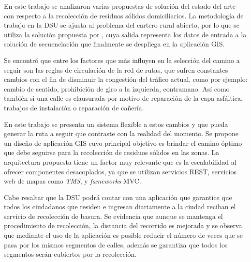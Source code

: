 
En este trabajo se analizaron varias propuestas de solución del estado del arte con respecto a la recolección de residuos sólidos domiciliarios. La metodología de trabajo en la DSU se ajusta al problema del cartero rural abierto, por lo que se utiliza la solución propuesta por \citet{Braier2017AnArgentina}, cuya salida representa los datos de entrada a la solución de secuenciación que finalmente se despliega en la aplicación GIS.

Se encontró que entre los factores que más influyen en la selección del camino a seguir son las reglas de circulación de la red de rutas, que sufren constantes cambios con el fin de disminuir la congestión del tráfico actual, como por ejemplo: cambio de sentido, prohibición de giro a la izquierda, contramano. Así como también si una calle es clausurada por motivo de reparación de la capa asfáltica, trabajos de instalación o reparación de cañería.

En este trabajo se presenta un sistema flexible a estos cambios y que pueda generar la ruta a seguir que contraste con la realidad del momento. Se propone un diseño de aplicación GIS cuyo principal objetivo es brindar el camino óptimo que debe seguirse para la recolección de residuos sólidos en las zonas. La arquitectura propuesta tiene un factor muy relevante que es la escalabilidad al ofrecer componentes desacoplados, ya que se utilizan servicios REST, servicios web de mapas como \textit{TMS}, y \textit{fameworks} MVC.

Cabe resaltar que la DSU podrá contar con una aplicación que garantice que todos los ciudadanos que residen e ingresan diariamente a la ciudad reciban el servicio de recolección de basura. Se evidencia que aunque se mantenga el procedimiento de recolección, la distancia del recorrido es mejorada y se observa que mediante el uso de la aplicación es posible reducir el número de veces que se pasa por los mismos segmentos de calles, además se garantiza que todos los segmentos serán cubiertos por la recolección.

